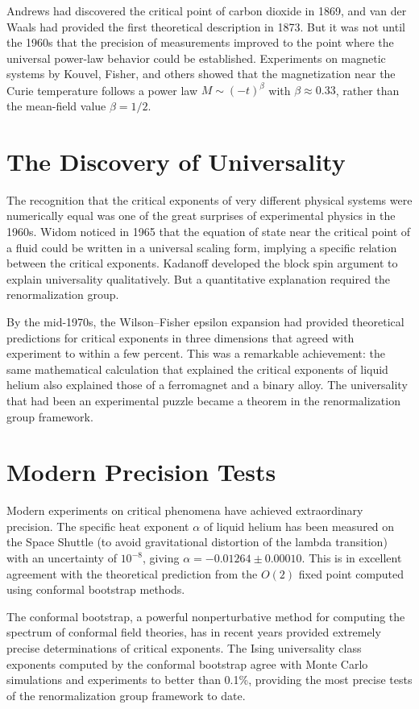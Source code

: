 \documentclass[11pt, twoside, openright]{book}
\theoremstyle{dotted}
\theoremstyle{definition}
\begin{document}
Andrews had discovered the critical point of carbon dioxide in 1869, and van der
Waals had provided the first theoretical description in 1873. But it was not until
the 1960s that the precision of measurements improved to the point where the
universal power-law behavior could be established. Experiments on magnetic systems
by Kouvel, Fisher, and others showed that the magnetization near the Curie
temperature follows a power law $M \sim (-t)^\beta$ with $\beta \approx 0.33$,
rather than the mean-field value $\beta = 1/2$.

\section{The Discovery of Universality}

The recognition that the critical exponents of very different physical systems
were numerically equal was one of the great surprises of experimental physics in
the 1960s. Widom noticed in 1965 that the equation of state near the critical
point of a fluid could be written in a universal scaling form, implying a specific
relation between the critical exponents. Kadanoff developed the block spin argument
to explain universality qualitatively. But a quantitative explanation required the
renormalization group.

By the mid-1970s, the Wilson--Fisher epsilon expansion had provided theoretical
predictions for critical exponents in three dimensions that agreed with experiment
to within a few percent. This was a remarkable achievement: the same mathematical
calculation that explained the critical exponents of liquid helium also explained
those of a ferromagnet and a binary alloy. The universality that had been an
experimental puzzle became a theorem in the renormalization group framework.

\section{Modern Precision Tests}

Modern experiments on critical phenomena have achieved extraordinary precision.
The specific heat exponent $\alpha$ of liquid helium has been measured on the Space
Shuttle (to avoid gravitational distortion of the lambda transition) with an
uncertainty of $10^{-8}$, giving $\alpha = -0.01264 \pm 0.00010$. This is in
excellent agreement with the theoretical prediction from the $O(2)$ fixed point
computed using conformal bootstrap methods.

The conformal bootstrap, a powerful nonperturbative method for computing the
spectrum of conformal field theories, has in recent years provided extremely
precise determinations of critical exponents. The Ising universality class exponents
computed by the conformal bootstrap agree with Monte Carlo simulations and
experiments to better than 0.1\%, providing the most precise tests of the
renormalization group framework to date.
\end{document}
